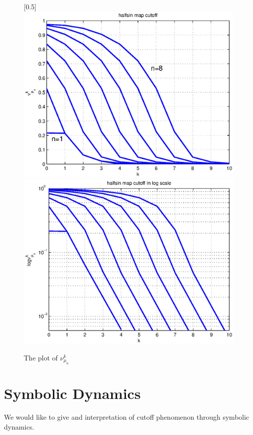 \documentclass{article}
\begin{document}
\begin{figure}
\caption{\label{halfsinmapcutoff} The plot of $\nu_{\mu_n}^k$}
\centerline{\scalebox{0.5}[0.5]{\includegraphics{halfsinmapcutoff.eps}
                                \includegraphics{halfsinmapcutofflog.eps}}}
\end{figure}

\section{Symbolic Dynamics}
We would like to give and interpretation of cutoff phenomenon through symbolic dynamics.
\end{document}
